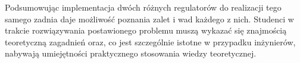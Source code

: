 \documentclass[conference]{IEEEtran}
\begin{document}
Podsumowując implementacja dwóch różnych regulatorów do realizacji tego samego zadnia daje możliwość poznania zalet i wad każdego z nich. Studenci w trakcie rozwiązywania postawionego problemu muszą wykazać się znajmością teoretyczną  zagadnień oraz, co jest szczególnie istotne w przypadku inżynierów, nabywają umiejętności praktycznego stosowania wiedzy teoretycznej. 




\end{document}
